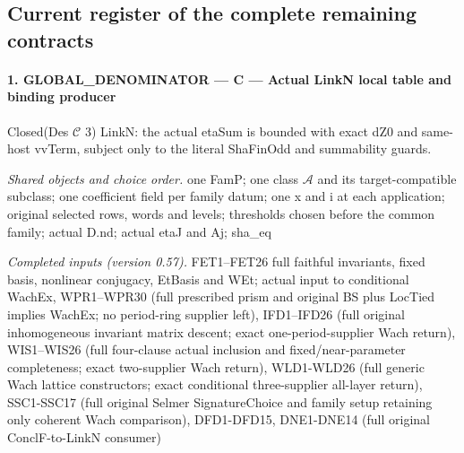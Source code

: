\documentclass[11pt,a4paper]{article}
\numberwithin{equation}{section}
\theoremstyle{remark}\newtheorem{remark}[theorem]{Remark}
\begin{document}
\subsection{Current register of the complete remaining contracts}

\paragraph{1. GLOBAL\_\allowbreak DENOMINATOR — C — Actual LinkN local table and binding producer}

Closed(Des $\mathcal C$ 3) LinkN: the actual etaSum is bounded with exact dZ0 and same-host vvTerm, subject only to the literal ShaFinOdd and summability guards.

\emph{Shared objects and choice order.} one FamP; one class $\mathcal A$ and its target-compatible subclass; one coefficient field per family datum; one x and i at each application; original selected rows, words and levels; thresholds chosen before the common family; actual D.nd; actual etaJ and Aj; sha\_\allowbreak eq

\emph{Completed inputs (version 0.57).} FET1–FET26 full faithful invariants, fixed basis, nonlinear conjugacy, EtBasis and WEt; actual input to conditional WachEx, WPR1–WPR30 (full prescribed prism and original BS plus LocTied implies WachEx; no period-ring supplier left), IFD1–IFD26 (full original inhomogeneous invariant matrix descent; exact one-period-supplier Wach return), WIS1–WIS26 (full four-clause actual inclusion and fixed/near-parameter completeness; exact two-supplier Wach return), WLD1-WLD26 (full generic Wach lattice constructors; exact conditional three-supplier all-layer return), SSC1-SSC17 (full original Selmer SignatureChoice and family setup retaining only coherent Wach comparison), DFD1-DFD15, DNE1-DNE14 (full original ConclF-to-LinkN consumer)
\end{document}
